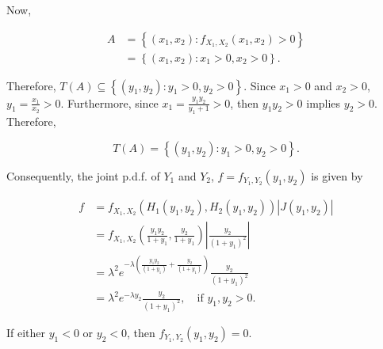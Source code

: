 \documentclass[
]{book}
\begin{document}
Now,

\begin{align*}
A &= \left\{ (x_1,x_2):f_{X_1,X_2}(x_1,x_2)>0 \right\} \\
&= \left\{ (x_1,x_2):x_1>0,x_2>0 \right\}.
\end{align*}

Therefore, \(T(A) \subseteq \left\{(y_1, y_2):y_1>0, y_2>0\right\}\). Since \(x_1>0\) and \(x_2>0\), \(y_1=\frac{x_1}{x_2}>0.\) Furthermore, since \(x_1=\frac{y_1y_2}{y_1+1}>0\), then \(y_1y_2>0\) implies \(y_2>0\). Therefore,

\[T(A)=\left\{ (y_1,y_2):y_1>0,y_2>0 \right\}.\]

Consequently, the joint p.d.f. of \(Y_1\) and \(Y_2\), \(f=f_{Y_1,Y_2}(y_1,y_2)\) is given by

\begin{align*}
f &= f_{X_1,X_2} \left( H_1(y_1,y_2),H_2(y_1,y_2) \right) \left| J(y_1,y_2) \right| \\[3pt]
&= f_{X_1,X_2} \left( \frac{y_1y_2}{1+y_1},\frac{y_2}{1+y_1} \right) \left|\frac{y_2}{(1+y_1)^2} \right| \\[3pt]
&= \lambda^2 e^{-\lambda \left( \frac{y_1y_2}{(1+y_1)} + \frac{y_2}{(1+y_1)} \right)} \frac{y_2}{(1+y_1)^2} \\[3pt]
&= \lambda^2 e^{-\lambda y_2} \frac{y_2}{(1+y_1)^2}, \quad \text{if } y_1,y_2>0.
\end{align*}

If either \(y_1<0\) or \(y_2<0\), then \(f_{Y_1,Y_2}(y_1,y_2)=0\).\\
\end{document}
